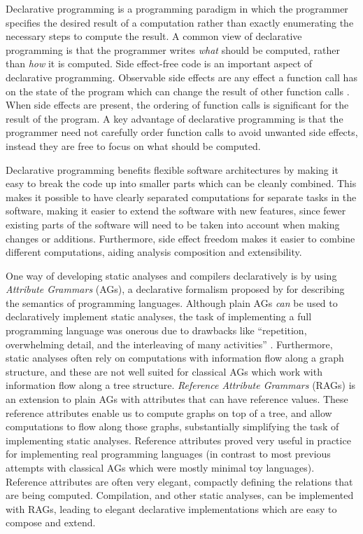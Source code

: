 \documentclass[10pt, twoside, openright]{book}
\begin{document}
Declarative programming is a programming paradigm in which
the programmer specifies the desired result of a computation rather than exactly enumerating
the necessary steps to compute the result. A common view of declarative programming is that the
programmer writes \emph{what} should be computed, rather than \emph{how} it is computed.
Side effect-free code is an important aspect of declarative programming.
Observable side effects are any effect a function call
has on the state of the program which can change the result of other function calls \cite{DBLP:conf/fase/Naumann05}.
When side effects are present, the ordering of function calls is significant for the result
of the program. A key advantage of declarative programming is that the programmer need not carefully
order function calls to avoid unwanted side effects, instead they are free to focus on what
should be computed.

Declarative programming benefits flexible software architectures by making it easy to break
the code up into smaller parts which can be cleanly combined.
This makes it possible to have clearly separated computations for separate tasks in the software,
making it easier to extend the software with new features, since fewer existing parts of the
software will need to be taken into account when making changes or additions.
Furthermore, side effect freedom makes it easier to combine different computations, aiding analysis
composition and extensibility.



One way of developing static analyses and compilers declaratively is by using
\emph{Attribute Grammars} (AGs), a declarative formalism proposed by
\textcite{DBLP:journals/mst/Knuth68} for describing the semantics of programming languages.
Although plain AGs \emph{can} be used to declaratively implement static analyses,
the task of implementing a full programming language was onerous due to drawbacks like
``repetition, overwhelming detail, and the interleaving of many activities'' \cite{DBLP:journals/cj/DueckC90}.
Furthermore, static analyses often rely on computations with
information flow along a graph structure, and these are not well suited for classical AGs
which work with information flow along a tree structure.
\emph{Reference Attribute Grammars} (RAGs) \cite{DBLP:journals/informaticaSI/Hedin00}
is an extension to plain AGs with attributes that can have reference values. These reference attributes
enable us to compute graphs on top of a tree, and allow computations to flow along those
graphs,
substantially simplifying the task of implementing static analyses. Reference attributes proved
very useful in practice for implementing real programming languages (in contrast to most previous
attempts with classical AGs which were mostly minimal toy languages).
Reference attributes are often very elegant, compactly defining the relations that are being
computed.
Compilation, and other static analyses, can be implemented with RAGs, leading to elegant declarative
implementations which are easy to compose and extend.
\end{document}
